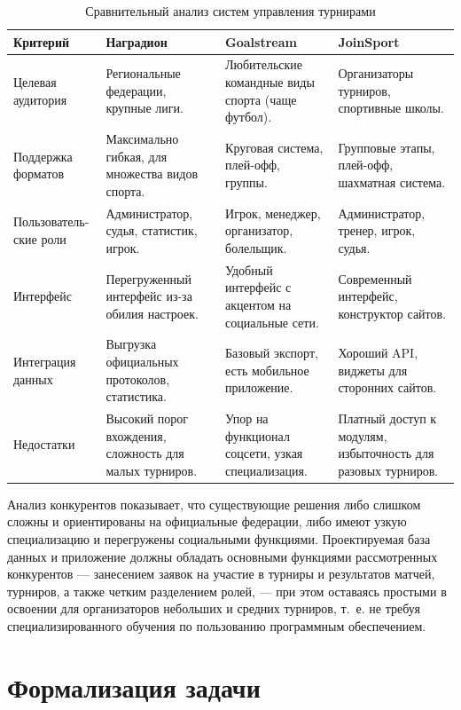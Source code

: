 \begin{table}[h]
	\centering
	\caption{Сравнительный анализ систем управления турнирами}
	\vspace{0.2cm}
	\label{tab:competitors}
	\begin{tabular}{|p{3.5cm}|p{3.5cm}|p{3.5cm}|p{3.5cm}|}
		\hline
		Критерий & Наградион~\cite{nagradion} & Goalstream~\cite{goalstream} & JoinSport~\cite{joinsport} \\ \hline
		Целевая аудитория & Региональные федерации, крупные лиги. & Любительские командные виды спорта (чаще футбол). & Организаторы турниров, спортивные школы. \\ \hline
		Поддержка форматов & Максимально гибкая, для множества видов спорта. & Круговая система, плей-офф, группы. & Групповые этапы, плей-офф, шахматная система. \\ \hline
		Пользователь-ские роли & Администратор, судья, статистик, игрок. & Игрок, менеджер, организатор, болельщик. & Администратор, тренер, игрок, судья. \\ \hline
		Интерфейс & Перегруженный интерфейс из-за обилия настроек. & Удобный интерфейс с акцентом на социальные сети. & Современный интерфейс, конструктор сайтов. \\ \hline
		Интеграция данных & Выгрузка официальных протоколов, статистика. & Базовый экспорт, есть мобильное приложение. & Хороший API, виджеты для сторонних сайтов. \\ \hline
		Недостатки & Высокий порог вхождения, сложность для малых турниров. & Упор на функционал соцсети, узкая специализация. & Платный доступ к модулям, избыточность для разовых турниров. \\ \hline
	\end{tabular}
\end{table}


Анализ конкурентов показывает, что существующие решения либо слишком сложны и ориентированы на официальные федерации, либо имеют узкую специализацию и перегружены социальными функциями. 
Проектируемая база данных и приложение должны обладать основными функциями рассмотренных конкурентов --- занесением заявок на участие в турниры и результатов матчей, турниров, а также четким разделением ролей, --- при этом оставаясь простыми в освоении для организаторов небольших и средних турниров, т.~е. не требуя специализированного обучения по пользованию программным обеспечением.

\section{Формализация задачи}

